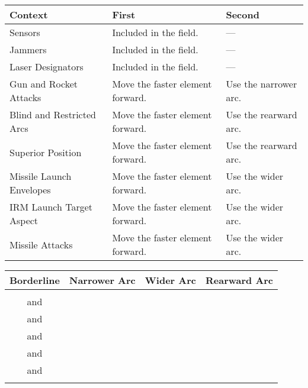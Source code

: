 \begin{twocolumntablefloat}

\begin{twocolumntable}

\small
\begin{tabularx}{0.7\linewidth}{lLl}
\toprule
Context&First&Second\\
\midrule
Sensors&Included in the field.&---\\
Jammers&Included in the field.&---\\
Laser Designators&Included in the field.&---\\
Gun and Rocket Attacks&Move the faster element forward.&Use the narrower arc.\\
Blind and Restricted Arcs&Move the faster element forward.&Use the rearward arc.\\
Superior Position&Move the faster element forward.&Use the rearward arc.\\
Missile Launch Envelopes&Move the faster element forward.&Use the wider arc.\\
IRM Launch Target Aspect&Move the faster element forward.&Use the wider arc.\\
Missile Attacks&Move the faster element forward.&Use the wider arc.\\
\bottomrule
\end{tabularx}


\end{twocolumntable}

\vspace{\floatsep}

\begin{twocolumntable}


\small
\begin{tabularx}{0.7\linewidth}{CCCC}
\toprule
Borderline&Narrower Arc&Wider Arc&Rearward Arc\\
\midrule
{}                                &\phantom{0}&\phantom{0}&\phantom{0}\\
\phantom{0} and \phantom{0}&\phantom{0}&\phantom{0}&\phantom{0}\\
\phantom{0} and \phantom{0}&\phantom{0}&\phantom{0}&\phantom{0}\\
\phantom{0} and \phantom{}&\phantom{0}&\phantom{}&\phantom{0}\\
\phantom{} and \phantom{}&\phantom{}&\phantom{}&\phantom{}\\
\phantom{} and \phantom{}&\phantom{}&\phantom{}&\phantom{}\\
                              &\phantom{}&\phantom{}&\phantom{}\\
\bottomrule
\end{tabularx}

\end{twocolumntable}


\end{twocolumntablefloat}
